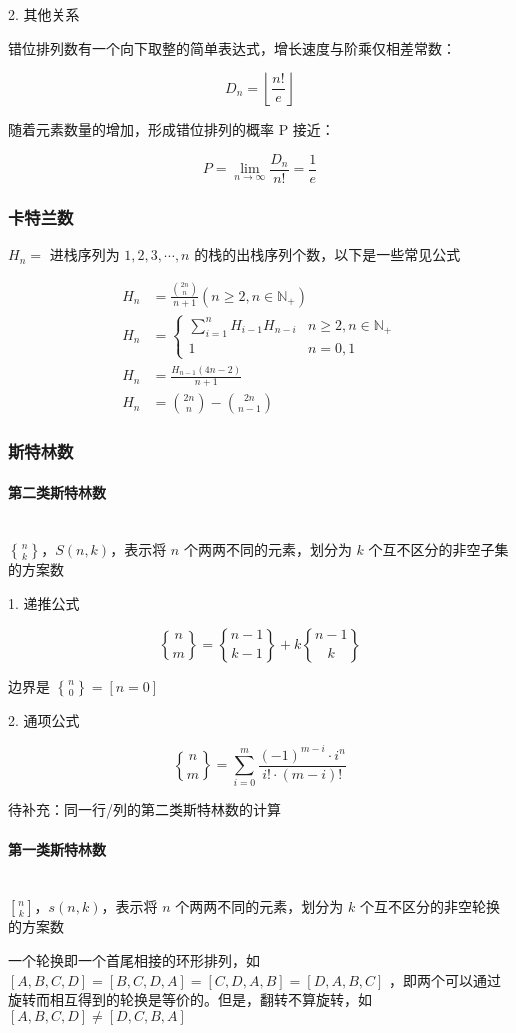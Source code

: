 \documentclass[12pt]{article}
\newcommand{\subsubsubsection}[1]{\paragraph{#1}\mbox{}\\}
\begin{document}
2. 其他关系

错位排列数有一个向下取整的简单表达式，增长速度与阶乘仅相差常数：

$$
D_n=\left\lfloor\frac{n!}{e}\right\rfloor
$$

随着元素数量的增加，形成错位排列的概率 P 接近：

$$
P=\lim_{n\to\infty}\frac{D_n}{n!}=\frac{1}{e}
$$

\subsubsection{卡特兰数}

$H_n=$ 进栈序列为 $1,2,3,\cdots,n$ 的栈的出栈序列个数，以下是一些常见公式

$$
\begin{aligned}
	H_{n}&=\frac{\binom{2n}{n}}{n+1}(n\ge2,n\in\mathbb{N}_{+})\\
	H_{n}&=
	\begin{cases}
		\sum_{i=1}^{n}H_{i-1}H_{n-i} & n\ge2,n\in\mathbb{N}_{+}\\
		1 & n=0,1
	\end{cases}\\
	H_{n}&=\frac{H_{n-1}(4n-2)}{n+1}\\
	H_{n}&=\binom{2n}{n}-\binom{2n}{n-1}
\end{aligned}
$$

\newpage

\subsubsection{斯特林数}

\subsubsubsection{第二类斯特林数}

$n\brace k$，$S(n,k)$，表示将 $n$ 个两两不同的元素，划分为 $k$ 个互不区分的非空子集的方案数

1. 递推公式

$$
{n\brace m}={n-1\brace k-1}+k{n-1\brace k}
$$

边界是 ${n\brace 0}=[n=0]$

2. 通项公式

$$
{n\brace m}=\sum_{i=0}^{m}\frac{(-1)^{m-i}\cdot i^n}{i!\cdot(m-i)!}
$$

待补充：同一行/列的第二类斯特林数的计算

\subsubsubsection{第一类斯特林数}

$n\brack k$，$s(n,k)$，表示将 $n$ 个两两不同的元素，划分为 $k$ 个互不区分的非空轮换的方案数

一个轮换即一个首尾相接的环形排列，如 $[A,B,C,D]=[B,C,D,A]=[C,D,A,B]=[D,A,B,C]$ ，即两个可以通过旋转而相互得到的轮换是等价的。但是，翻转不算旋转，如 $[A,B,C,D]\ne[D,C,B,A]$
\end{document}

